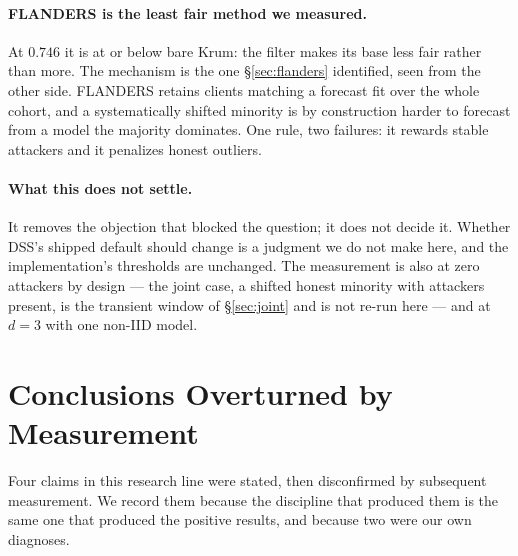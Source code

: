 \documentclass[11pt,a4paper]{article}
\begin{document}
\paragraph{FLANDERS is the least fair method we measured.} At $0.746$ it
is at or below bare Krum: the filter makes its base less fair rather
than more. The mechanism is the one \S\ref{sec:flanders} identified,
seen from the other side. FLANDERS retains clients matching a forecast
fit over the whole cohort, and a systematically shifted minority is by
construction harder to forecast from a model the majority dominates. One
rule, two failures: it rewards stable attackers and it penalizes honest
outliers.

\paragraph{What this does not settle.} It removes the objection that
blocked the question; it does not decide it. Whether DSS's shipped
default should change is a judgment we do not make here, and the
implementation's thresholds are unchanged. The measurement is also at
zero attackers by design --- the joint case, a shifted honest minority
with attackers present, is the transient window of
\S\ref{sec:joint} and is not re-run here --- and at $d = 3$ with one
non-IID model.

\section{Conclusions Overturned by Measurement}
\label{sec:overturned}

Four claims in this research line were stated, then disconfirmed by
subsequent measurement. We record them because the discipline that
produced them is the same one that produced the positive results, and
because two were our own diagnoses.
\end{document}
